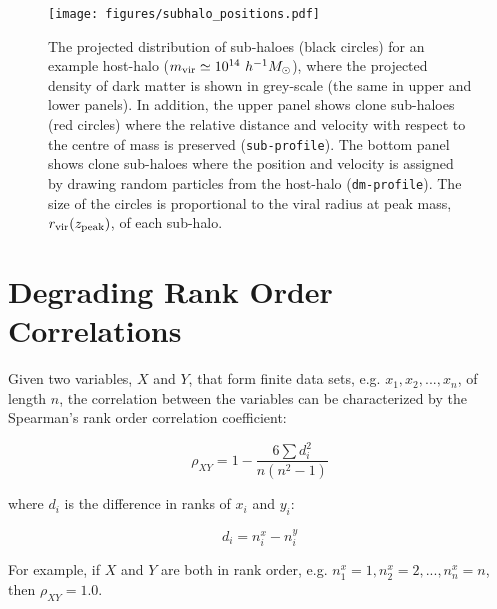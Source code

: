 \documentclass[a4paper,fleqn,usenatbib]{mnras}
\begin{document}
%
\begin{figure}
\texttt{[image: figures/subhalo\_positions.pdf]}
\caption{The projected distribution of sub-haloes (black circles) for an example host-halo ($m_{\rm vir}\simeq 10^{14}~h^{-1}M_{\odot}$), where the projected density of dark matter is shown in grey-scale (the same in upper and lower panels).  In addition, the upper panel shows clone sub-haloes (red circles) where the relative distance and velocity with respect to the centre of mass is preserved ({\tt sub-profile}).  The bottom panel shows clone sub-haloes where the position and velocity is assigned by drawing random particles from the host-halo ({\tt dm-profile}).  The size of the circles is proportional to the viral radius at peak mass, $r_{\rm vir}(z_{\rm peak})$, of each sub-halo.}
\label{fig:subhalo_positions}
\end{figure}
%

\section{Degrading Rank Order Correlations}
\label{appendix:ranks}

Given two variables, $X$ and $Y$, that form finite data sets, e.g. $x_1, x_2, ..., x_n$, of length $n$, the correlation between the variables can be characterized by the Spearman's rank order correlation coefficient:
%
\begin{linenomath}
\begin{equation}
\rho_{XY} =1-\frac{6 \sum d_i^2}{n(n^2-1)}
\end{equation}
\end{linenomath}
%
where $d_i$ is the difference in ranks of $x_i$ and $y_i$:
%
\begin{linenomath}
\begin{equation}
d_i = n_i^x- n_i^y
\end{equation}
\end{linenomath}
%
For example, if $X$ and $Y$ are both in rank order, e.g. $n_1^x = 1, n_2^x=2, ..., n_n^x = n$, then $\rho_{XY}=1.0$.
\end{document}
